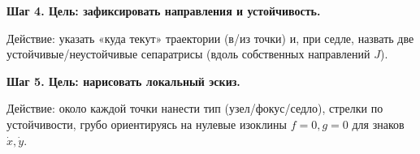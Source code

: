 \textbf{Шаг 4. Цель: зафиксировать направления и устойчивость.}

Действие: указать «куда текут» траектории (в/из точки) и, при седле, назвать две устойчивые/неустойчивые сепаратрисы (вдоль собственных направлений $J$).

\textbf{Шаг 5. Цель: нарисовать локальный эскиз.}

Действие: около каждой точки нанести тип (узел/фокус/седло), стрелки по устойчивости, грубо ориентируясь на нулевые изоклины $f = 0, g = 0$ для знаков $\dot{x}, \dot{y}$.

